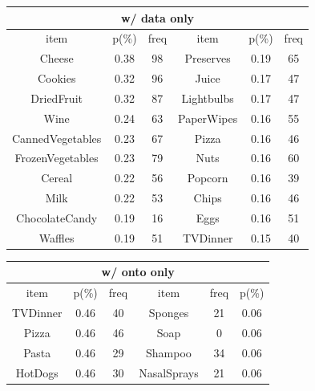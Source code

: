 


\begin{table}[tbh]\scriptsize
\begin{center}
\begin{tabular}{ c c c | c c c |}
\hline											
\multicolumn{6}{c|}{w/ data only}\\											
\hline											
item	&	p(\%)	&	freq	&	item	&	p(\%)	&	freq	 \\
\hline											
Cheese	&	0.38	&	98	&	Preserves	&	0.19	&	65	 \\
Cookies	&	0.32	&	96	&	Juice	&	0.17	&	47	\\
DriedFruit	&	0.32	&	87	&	Lightbulbs	&	0.17	&	47	 \\
Wine	&	0.24	&	63	&	PaperWipes	&	0.16	&	55	 \\
CannedVegetables	&	0.23	&	67	&	Pizza	&	0.16	&	46	 \\
FrozenVegetables	&	0.23	&	79	&	Nuts	&	0.16	&	60	 \\
Cereal	&	0.22	&	56	&	Popcorn	&	0.16	&	39	 \\
Milk	&	0.22	&	53	&	Chips	&	0.16	&	46	 \\
ChocolateCandy	&	0.19	&	16	&	Eggs	&	0.16	&	51	 \\
Waffles	&	0.19	&	51	&	TVDinner	&	0.15	&	40	 \\
\hline									
\end{tabular}
\begin{tabular}{ | c c c | c c c }
\hline									
\multicolumn{6}{|c}{w/ onto only}\\											
\hline
item	&	p(\%)	&	freq	&	item	&	freq	&	 p(\%)	 \\
\hline
TVDinner	&	0.46	&	40	&	Sponges	&	21	&	0.06	 \\
Pizza	&	0.46	&	46	&	Soap	&	0	&	0.06	\\
Pasta	&	0.46	&	29	&	Shampoo	&	34	&	0.06	 \\
HotDogs	&	0.46	&	30	&	NasalSprays	&	21	&	0.06	 \\

\end{tabular}
\end{center}
\end{table}
